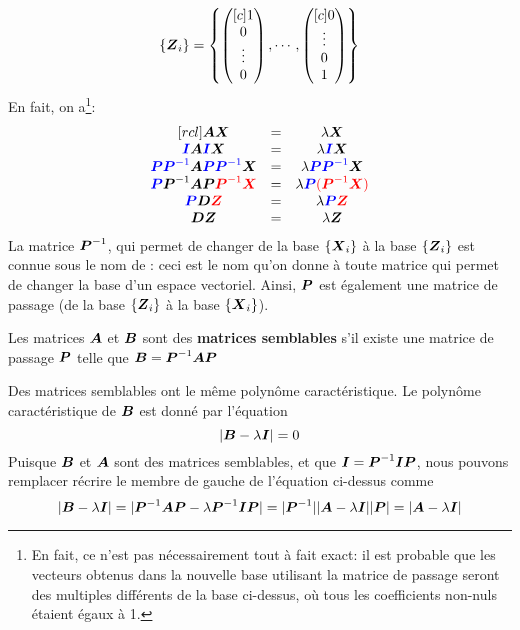 \[
\{\boldsymbol{Z}_i\} = \left\{ 
\begin{pmatrix}[c]
1\\0\\ \vdots \\ 0
\end{pmatrix}
,\cdots,
\begin{pmatrix}[c]
0\\ \vdots\\ 0 \\ 1
\end{pmatrix}
\right\}
\]
En fait, on a\footnote{En fait, ce n'est pas nécessairement tout à fait exact: il est probable que les vecteurs obtenus dans
la nouvelle base utilisant la matrice de passage seront des multiples différents de la base ci-dessus, où tous les coefficients non-nuls étaient
égaux à 1.}:
\[
\begin{matrix}[rcl]
\boldsymbol{A}\boldsymbol{X} &=& \lambda\boldsymbol{X} \\
\textcolor{blue}{\boldsymbol{I}}\boldsymbol{A}\textcolor{blue}{\boldsymbol{I}}\boldsymbol{X} &=& \lambda\textcolor{blue}{\boldsymbol{I}}\boldsymbol{X} \\
\textcolor{blue}{\boldsymbol{P}\boldsymbol{P}^{-1}}\boldsymbol{A}\textcolor{blue}{\boldsymbol{P}\boldsymbol{P}^{-1}}\boldsymbol{X} &=& \lambda\textcolor{blue}{\boldsymbol{P}\boldsymbol{P}^{-1}}\boldsymbol{X} \\
\textcolor{blue}{\boldsymbol{P}}\boldsymbol{P}^{-1}\boldsymbol{A}\boldsymbol{P} \textcolor{red}{\boldsymbol{P}^{-1}\boldsymbol{X}} &=& \lambda\textcolor{blue}{\boldsymbol{P}}\textcolor{red}{(\boldsymbol{P}^{-1}\boldsymbol{X})} \\
\textcolor{blue}{\boldsymbol{P}} \boldsymbol{D} \textcolor{red}{\boldsymbol{Z}} &=& \lambda\textcolor{blue}{\boldsymbol{P}} \textcolor{red}{\boldsymbol{Z}} \\
\boldsymbol{D} \boldsymbol{Z} &=& \lambda \boldsymbol{Z}
\end{matrix}
\]
La matrice $\boldsymbol{P}^{-1}$, qui permet de changer de la base $\{\boldsymbol{X}_i\}$ à la base 
$\{\boldsymbol{Z}_i\}$ est connue sous le nom de : ceci est le
nom qu'on donne à toute matrice qui permet de changer la base d'un espace vectoriel.
Ainsi, $\boldsymbol{P}$ est également une matrice de passage (de la base $\{\boldsymbol{Z}_i\}$ à la base $\{\boldsymbol{X}_i\}$).

\begin{defini}
Les matrices $\boldsymbol{A}$ et $\boldsymbol{B}$ sont des 
\textbf{matrices semblables} s'il existe une
matrice de passage $\boldsymbol{P}$ telle que $\boldsymbol{B} = \boldsymbol{P}^{-1}\boldsymbol{A}\boldsymbol{P}$
\end{defini}

\begin{theo}
Des matrices semblables ont le même polynôme caractéristique.
\proof
Le polynôme caractéristique de $\boldsymbol{B}$ est donné par l'équation
\[
|\boldsymbol{B} -\lambda\boldsymbol{I}| = 0
\]
Puisque $\boldsymbol{B}$ et $\boldsymbol{A}$ sont des matrices semblables, et que
$\boldsymbol{I} = \boldsymbol{P}^{-1}\boldsymbol{I}\boldsymbol{P}$, nous pouvons remplacer récrire le membre
de gauche de l'équation
ci-dessus comme
\[
|\boldsymbol{B} -\lambda\boldsymbol{I}| = |\boldsymbol{P}^{-1}\boldsymbol{A}\boldsymbol{P} -\lambda\boldsymbol{P}^{-1}\boldsymbol{I}\boldsymbol{P}| = |\boldsymbol{P}^{-1}| |\boldsymbol{A} -\lambda\boldsymbol{I}| |\boldsymbol{P}| = |\boldsymbol{A} -\lambda\boldsymbol{I}| 
\]
\end{theo}

